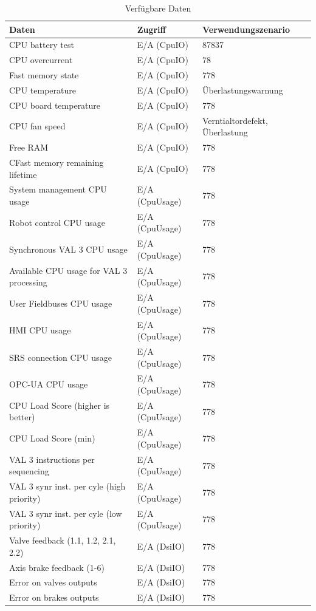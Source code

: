 \documentclass[ a4paper,
                oneside,
                toc=bibliography,
                toc=listof
                ]{scrbook}
\begin{document}
	\begin{longtable}{|p{6cm}|p{4cm}|p{4cm}|}
		\caption{Verfügbare Daten}
		\label{table:Daten}\\
		\hline
		Daten & Zugriff & Verwendungszenario  \\ [0.5ex] 
		\hline
		\endhead
		CPU battery test & E/A (CpuIO) & 87837  \\ 
		CPU overcurrent & E/A (CpuIO) & 78  \\
		Fast memory state & E/A (CpuIO) & 778 \\
		CPU temperature & E/A (CpuIO) & Überlastungswarnung \\
		CPU board temperature & E/A (CpuIO) & 778 \\
		CPU fan speed & E/A (CpuIO) & Verntialtordefekt, Überlastung \\
		Free RAM & E/A (CpuIO) & 778 \\
		CFast memory remaining lifetime & E/A (CpuIO) & 778 \\
		\hline
		System management CPU usage & E/A (CpuUsage) & 778 \\
		Robot control CPU usage & E/A (CpuUsage) & 778 \\			
		Synchronous VAL 3 CPU usage & E/A (CpuUsage) & 778 \\
		Available CPU usage for VAL 3 processing& E/A (CpuUsage) & 778 \\
		User Fieldbuses CPU usage & E/A (CpuUsage) & 778 \\
		HMI CPU usage & E/A (CpuUsage) & 778 \\
		SRS connection CPU usage & E/A (CpuUsage) & 778 \\
		OPC-UA CPU usage & E/A (CpuUsage) & 778 \\
		CPU Load Score (higher is better)& E/A (CpuUsage) & 778 \\
		CPU Load Score (min) & E/A (CpuUsage) & 778 \\
		VAL 3 instructions per sequencing & E/A (CpuUsage) & 778 \\
		VAL 3 synr inst. per cyle (high priority) & E/A (CpuUsage) & 778 \\
		VAL 3 synr inst. per cyle (low priority) & E/A (CpuUsage) & 778 \\
		\hline
		Valve feedback (1.1, 1.2, 2.1, 2.2) & E/A (DsiIO) & 778 \\
		Axis brake feedback (1-6) & E/A (DsiIO) & 778 \\
		Error on valves outputs & E/A (DsiIO) & 778 \\
		Error on brakes outputs & E/A (DsiIO) & 778 \\

\end{longtable}
\end{document}
